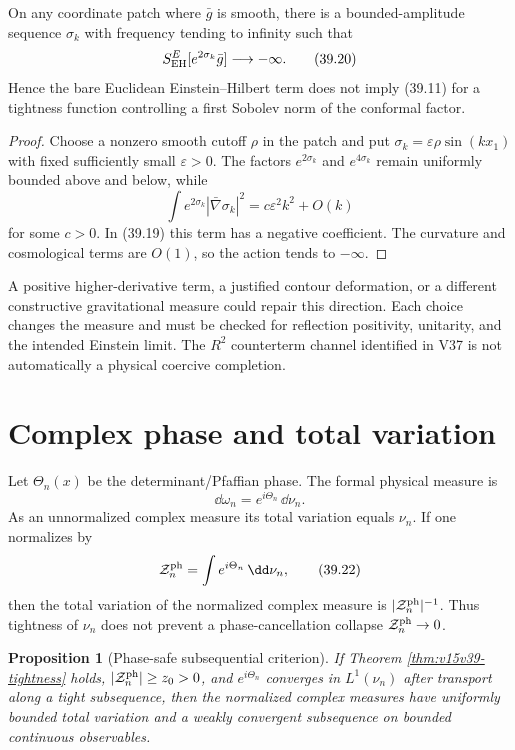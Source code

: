 \documentclass[11pt]{article}
\newtheorem{proposition}[theorem]{Proposition}
\theoremstyle{remark}
\begin{document}
\begin{countertheorem}
\label{cth:v15v39-conformal}
On any coordinate patch where \(\bar g\) is smooth, there is a
bounded-amplitude sequence \(\sigma_k\) with frequency tending to
infinity such that
\[
 S_{\rm EH}^{E}[e^{2\sigma_k}\bar g]\longrightarrow-\infty.
                                                               \tag{39.20}
\]
Hence the bare Euclidean Einstein--Hilbert term does not imply
(39.11) for a tightness function controlling a first Sobolev norm of
the conformal factor.
\end{countertheorem}

\begin{proof}
Choose a nonzero smooth cutoff \(\rho\) in the patch and put
\(\sigma_k=\varepsilon\rho\sin(kx_1)\) with fixed sufficiently small
\(\varepsilon>0\).  The factors \(e^{2\sigma_k}\) and
\(e^{4\sigma_k}\) remain uniformly bounded above and below, while
\[
 \int e^{2\sigma_k}|\bar\nabla\sigma_k|^2
 =c\varepsilon^2k^2+O(k)
\]
for some \(c>0\).  In (39.19) this term has a negative coefficient.
The curvature and cosmological terms are \(O(1)\), so the action
tends to \(-\infty\).
\end{proof}

A positive higher-derivative term, a justified contour deformation,
or a different constructive gravitational measure could repair this
direction.  Each choice changes the measure and must be checked for
reflection positivity, unitarity, and the intended Einstein limit.
The \(R^2\) counterterm channel identified in V37 is not
automatically a physical coercive completion.

\section{Complex phase and total variation}

Let \(\Theta_n(x)\) be the determinant/Pfaffian phase.  The formal
physical measure is
\[
 \dd\omega_n=e^{i\Theta_n}\,\dd\nu_n.                   \tag{39.21}
\]
As an unnormalized complex measure its total variation equals
\(\nu_n\).  If one normalizes by
\[
 {\cal Z}_n^{\rm ph}=\int e^{i\Theta_n}\,\dd\nu_n,       \tag{39.22}
\]
then the total variation of the normalized complex measure is
\(|{\cal Z}_n^{\rm ph}|^{-1}\).  Thus tightness of \(\nu_n\) does
not prevent a phase-cancellation collapse
\({\cal Z}_n^{\rm ph}\to0\).

\begin{proposition}[Phase-safe subsequential criterion]
\label{prop:v15v39-phase}
If Theorem \ref{thm:v15v39-tightness} holds,
\(|{\cal Z}_n^{\rm ph}|\geq z_0>0\), and
\(e^{i\Theta_n}\) converges in \(L^1(\nu_n)\) after transport along
a tight subsequence, then the normalized complex measures have
uniformly bounded total variation and a weakly convergent
subsequence on bounded continuous observables.
\end{proposition}
\end{document}
